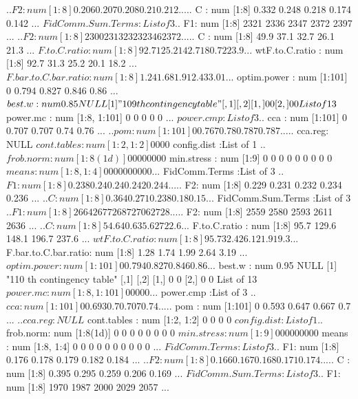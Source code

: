 \documentclass[11pt]{article} %
\begin{document}
\begin{Schunk}
\begin{Soutput}
  ..$ F2: num [1:8] 0.206 0.207 0.208 0.21 0.212 ...
  ..$ C : num [1:8] 0.332 0.248 0.218 0.174 0.142 ...
 $ FidComm.Sum.Terms   :List of 3
  ..$ F1: num [1:8] 2321 2336 2347 2372 2397 ...
  ..$ F2: num [1:8] 2300 2313 2323 2346 2372 ...
  ..$ C : num [1:8] 49.9 37.1 32.7 26.1 21.3 ...
 $ F.to.C.ratio        : num [1:8] 92.7 125.2 142.7 180.7 223.9 ...
 $ wtF.to.C.ratio      : num [1:8] 92.7 31.3 25.2 20.1 18.2 ...
 $ F.bar.to.C.bar.ratio: num [1:8] 1.24 1.68 1.91 2.43 3.01 ...
 $ optim.power         : num [1:101] 0 0.794 0.827 0.846 0.86 ...
 $ best.w              : num 0.85
NULL
[1] "109 th contingency table"
     [,1] [,2]
[1,]    0    0
[2,]    0    0
List of 13
 $ power.mc            : num [1:8, 1:101] 0 0 0 0 0 ...
 $ power.cmp           :List of 3
  ..$ cca    : num [1:101] 0 0.707 0.707 0.74 0.76 ...
  ..$ pom    : num [1:101] 0 0.767 0.78 0.787 0.787 ...
  ..$ cca.reg: NULL
 $ cont.tables         : num [1:2, 1:2] 0 0 0 0
 $ config.dist         :List of 1
  ..$ frob.norm: num [1:8(1d)] 0 0 0 0 0 0 0 0
 $ min.stress          : num [1:9] 0 0 0 0 0 0 0 0 0
 $ means               : num [1:8, 1:4] 0 0 0 0 0 0 0 0 0 0 ...
 $ FidComm.Terms       :List of 3
  ..$ F1: num [1:8] 0.238 0.24 0.24 0.242 0.244 ...
  ..$ F2: num [1:8] 0.229 0.231 0.232 0.234 0.236 ...
  ..$ C : num [1:8] 0.364 0.271 0.238 0.18 0.15 ...
 $ FidComm.Sum.Terms   :List of 3
  ..$ F1: num [1:8] 2664 2677 2687 2706 2728 ...
  ..$ F2: num [1:8] 2559 2580 2593 2611 2636 ...
  ..$ C : num [1:8] 54.6 40.6 35.6 27 22.6 ...
 $ F.to.C.ratio        : num [1:8] 95.7 129.6 148.1 196.7 237.6 ...
 $ wtF.to.C.ratio      : num [1:8] 95.7 32.4 26.1 21.9 19.3 ...
 $ F.bar.to.C.bar.ratio: num [1:8] 1.28 1.74 1.99 2.64 3.19 ...
 $ optim.power         : num [1:101] 0 0.794 0.827 0.846 0.86 ...
 $ best.w              : num 0.95
NULL
[1] "110 th contingency table"
     [,1] [,2]
[1,]    0    0
[2,]    0    0
List of 13
 $ power.mc            : num [1:8, 1:101] 0 0 0 0 0 ...
 $ power.cmp           :List of 3
  ..$ cca    : num [1:101] 0 0.693 0.7 0.707 0.74 ...
  ..$ pom    : num [1:101] 0 0.593 0.647 0.667 0.7 ...
  ..$ cca.reg: NULL
 $ cont.tables         : num [1:2, 1:2] 0 0 0 0
 $ config.dist         :List of 1
  ..$ frob.norm: num [1:8(1d)] 0 0 0 0 0 0 0 0
 $ min.stress          : num [1:9] 0 0 0 0 0 0 0 0 0
 $ means               : num [1:8, 1:4] 0 0 0 0 0 0 0 0 0 0 ...
 $ FidComm.Terms       :List of 3
  ..$ F1: num [1:8] 0.176 0.178 0.179 0.182 0.184 ...
  ..$ F2: num [1:8] 0.166 0.167 0.168 0.171 0.174 ...
  ..$ C : num [1:8] 0.395 0.295 0.259 0.206 0.169 ...
 $ FidComm.Sum.Terms   :List of 3
  ..$ F1: num [1:8] 1970 1987 2000 2029 2057 ...

\end{Soutput}
\end{Schunk}
\end{document}
